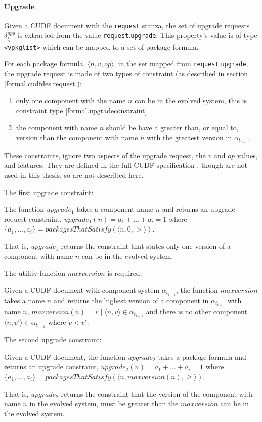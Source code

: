 \paragraph{Upgrade}
Given a CUDF document with the \texttt{request} stanza, the set of upgrade requests $\delta_{t_i}^{upg}$ is extracted from the value \texttt{request}.\texttt{upgrade}.
This property's value is of type \texttt{<vpkglist>} which can be mapped to a set of package formula.

For each package formula, $\langle n, v, op \rangle$, in the set mapped from \texttt{request}.\texttt{upgrade}, the upgrade request is made of two types of constraint 
(as described in section \ref{formal.cudfdes.request}):
\begin{enumerate}
  \item only one component with the name $n$ can be in the evolved system, this is constraint type \ref{formal.upgradeconstraint}.
  \item the component with name $n$ should be have a greater than, or equal to, version than the component with name $n$ with the greatest version in $\alpha_{t_{i-1}}$.
\end{enumerate}
These constraints, ignore two aspects of the upgrade request, the $v$ and $op$ values, and features.
They are defined in the full CUDF specification \citep{treinen2009common}, though are not used in this thesis, so are not described here.

The first upgrade constraint:
\begin{defs}
The function  $upgrade_1$ takes a component name $n$ and returns an upgrade request constraint, 
$upgrade_1(n) = a_1 + \ldots + a_i = 1$ where $\{a_1,\ldots,a_i\} = packagesThatSatisfy(\langle n,0,>\rangle)$. 
\end{defs}
That is, $upgrade_1$ returns the constraint that states only one version of a component with name $n$ can be in the evolved system.

The utility function $maxversion$ is required:
\begin{defs}
Given a CUDF document with component system $\alpha_{t_{i-1}}$, the function $maxversion$ takes a name $n$ and returns the highest version of a component in $\alpha_{t_{i-1}}$ with name $n$,
$maxversion(n) = v  \mid \langle n,v \rangle \in \alpha_{t_{i-1}}$ and there is no other component $\langle n,v' \rangle \in \alpha_{t_{i-1}}$ where $v < v'$.
\end{defs}

The second upgrade constraint:
\begin{defs}
Given a CUDF document, the function $upgrade_2$ takes a package formula and returns an upgrade constraint,
$upgrade_2(n) = a_1 + \ldots + a_i = 1$ where $\{a_1,\ldots,a_i\} = packagesThatSatisfy(\langle n,maxversion(n),\geq\rangle)$. 
\end{defs}
That is, $upgrade_2$ returns the constraint that the version of the component with name $n$ in the evolved system, must be greater than the $maxversion$ can be in the evolved system.

